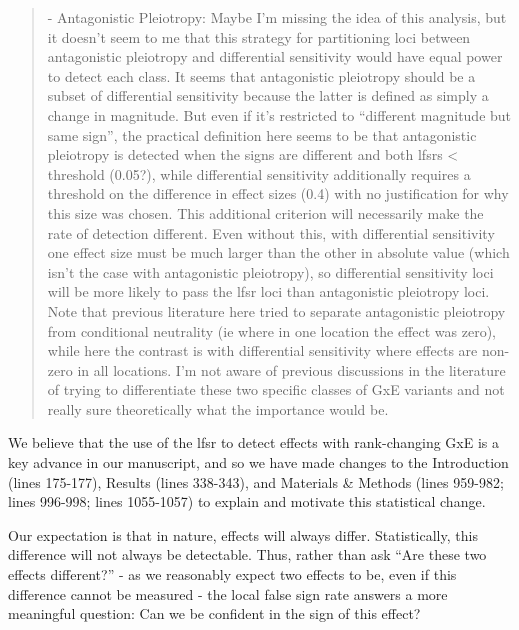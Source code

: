 \documentclass[
  letterpaper,
  DIV=11,
  numbers=noendperiod]{scrartcl}
\begin{document}
\begin{quote}
\begin{tcolorbox}[enhanced jigsaw, rightrule=.15mm, colframe=quarto-callout-warning-color-frame, leftrule=.75mm, arc=.35mm, colback=white, opacityback=0, left=2mm, breakable, toprule=.15mm, bottomrule=.15mm]

- Antagonistic Pleiotropy: Maybe I'm missing the idea of this analysis,
but it doesn't seem to me that this strategy for partitioning loci
between antagonistic pleiotropy and differential sensitivity would have
equal power to detect each class. It seems that antagonistic pleiotropy
should be a subset of differential sensitivity because the latter is
defined as simply a change in magnitude. But even if it's restricted to
``different magnitude but same sign'', the practical definition here
seems to be that antagonistic pleiotropy is detected when the signs are
different and both lfsrs \textless{} threshold (0.05?), while
differential sensitivity additionally requires a threshold on the
difference in effect sizes (0.4) with no justification for why this size
was chosen. This additional criterion will necessarily make the rate of
detection different. Even without this, with differential sensitivity
one effect size must be much larger than the other in absolute value
(which isn't the case with antagonistic pleiotropy), so differential
sensitivity loci will be more likely to pass the lfsr loci than
antagonistic pleiotropy loci. Note that previous literature here tried
to separate antagonistic pleiotropy from conditional neutrality (ie
where in one location the effect was zero), while here the contrast is
with differential sensitivity where effects are non-zero in all
locations. I'm not aware of previous discussions in the literature of
trying to differentiate these two specific classes of GxE variants and
not really sure theoretically what the importance would be.

\end{tcolorbox}
\end{quote}

We believe that the use of the lfsr to detect effects with rank-changing
GxE is a key advance in our manuscript, and so we have made changes to
the Introduction (lines 175-177), Results (lines 338-343), and Materials
\& Methods (lines 959-982; lines 996-998; lines 1055-1057) to explain
and motivate this statistical change.

Our expectation is that in nature, effects will always differ.
Statistically, this difference will not always be detectable. Thus,
rather than ask ``Are these two effects different?'' - as we reasonably
expect two effects to be, even if this difference cannot be measured -
the local false sign rate answers a more meaningful question: Can we be
confident in the sign of this effect?
\end{document}
